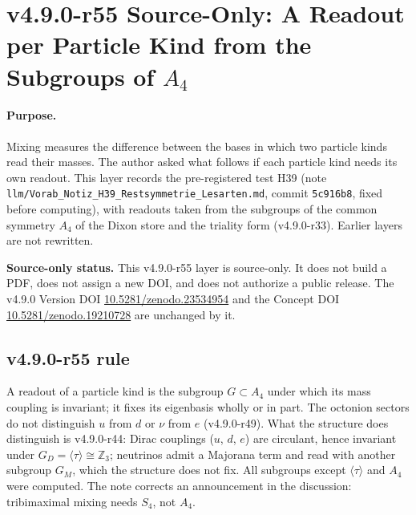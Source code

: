 \clearpage
\section*{v4.9.0-r55 Source-Only: A Readout per Particle Kind from the Subgroups of \texorpdfstring{\(A_4\)}{A4}}
\label{sec:v490-r55-residual-readouts}

\paragraph{Purpose.}
Mixing measures the difference between the bases in which two particle kinds read their masses.  The author asked what follows if each particle
kind needs its own readout.  This layer records the pre-registered test H39 (note \texttt{llm/Vorab\_Notiz\_H39\_Restsymmetrie\_Lesarten.md}, commit
\texttt{5c916b8}, fixed before computing), with readouts taken from the subgroups of the common symmetry \(A_4\) of the Dixon store and the triality
form (v4.9.0-r33).  Earlier layers are not rewritten.

\noindent\textbf{Source-only status.}
This v4.9.0-r55 layer is source-only.  It does not build a PDF, does not assign a new DOI,
and does not authorize a public release.  The v4.9.0 Version DOI
\href{https://doi.org/10.5281/zenodo.23534954}{10.5281/zenodo.23534954} and the Concept DOI
\href{https://doi.org/10.5281/zenodo.19210728}{10.5281/zenodo.19210728} are unchanged by it.

\subsection*{v4.9.0-r55 rule}
\label{subsec:v490-r55-rule}

A readout of a particle kind is the subgroup \(G\subset A_4\) under which its mass coupling is invariant; it fixes its eigenbasis wholly or in part.
The octonion sectors do not distinguish \(u\) from \(d\) or \(\nu\) from \(e\) (v4.9.0-r49).  What the structure does distinguish is v4.9.0-r44:
Dirac couplings (\(u\), \(d\), \(e\)) are circulant, hence invariant under \(G_D=\langle\tau\rangle\cong\mathbb Z_3\); neutrinos admit a Majorana term and read
with another subgroup \(G_M\), which the structure does not fix.  All subgroups except \(\langle\tau\rangle\) and \(A_4\) were computed.  The note
corrects an announcement in the discussion: tribimaximal mixing needs \(S_4\), not \(A_4\).

